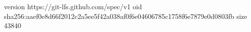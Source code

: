 version https://git-lfs.github.com/spec/v1
oid sha256:aaef0e8d66f2012c2a5ee5f42a038af0f6e04606785c1758f6e7879e0d0803fb
size 43840
